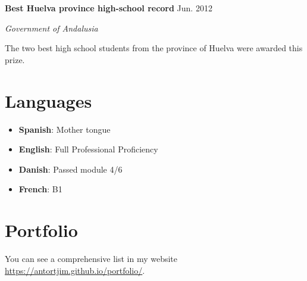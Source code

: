 \documentclass[paper=a4,fontsize=11pt]{article}
\newcommand{\NewPart}[1]{
\vspace{-15pt}
\section*{
{#1}}}
\newcommand{\Entry}[4]{
		\noindent \textbf{#1} \hfill      %
		{\color{gray}\textsf{#2}} \par                  %
		\noindent \textit{#3} \par        %
		  \noindent \small #4  %
		\normalsize \par \vspace{7.5pt}}
\begin{document}
\Entry{Best Huelva province high-school record}{Jun. 2012}{Government of Andalusia}{The two best high school students from the province of Huelva were awarded this prize.}




\NewPart{Languages}

\begin{multicols}{2}

\begin{itemize}
\item \textbf{Spanish}: Mother tongue
\item \textbf{English}: Full Professional Proficiency
\end{itemize}

\columnbreak

\begin{itemize}
\item \textbf{Danish}: Passed module 4/6
\item \textbf{French}: B1
\end{itemize}

\end{multicols}

\NewPart{Portfolio}

You can see a comprehensive list in my website \href{https://antortjim.github.io/portfolio/}{https://antortjim.github.io/portfolio/}.



\end{document}
